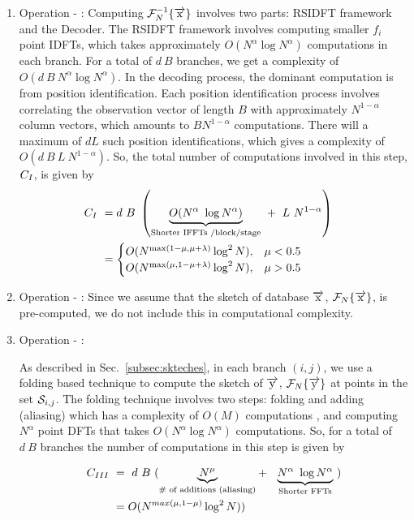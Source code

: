 \begin{enumerate} 
	\item  Operation - :
	 Computing $\mathcal{F}_{N}^{-1}\{ \overrightarrow{\mathrm{x}} \}$ involves two parts: RSIDFT framework and the Decoder. The RSIDFT framework involves computing smaller $f_i$ point IDFTs, which takes approximately $O(N^{\alpha} \log N^{\alpha})$ computations in each branch. For a total of $d~B$ branches, we get a complexity of $O(d ~ B ~ N^{\alpha} \log N^{\alpha})$. In the decoding process, the dominant computation is from position identification. Each position identification process involves correlating the observation vector of length $B$ with approximately $N^{1-\alpha}$ column vectors, which amounts to $B N^{1-\alpha}$ computations. There will a maximum of $d L$ such position identifications, which gives a complexity of $O(d ~B ~L ~N^{1-\alpha} )$.   So, the total number of computations involved in this step, $C_{\RNum{1}}$, is given by
	\begin{align*}
	C_{\RNum{1}} \ &=  {d ~ B} \ \left (
	\underset{\text{Shorter IFFTs /block/stage} }{\underbrace{ O(N^{\alpha} \ \log N^{\alpha})}}  ~ + ~ L~N^{1-\alpha} \right )& \\
	\vspace{2pt}
	\ & =	
	\begin{cases}
	O(N^{\max(1-\mu, \mu + \lambda) } \log^2 N ), &  	 \mu < 0.5\\
	O(N^{\max(\mu, 1- \mu + \lambda )} \log^2 N ), &  	 \mu > 0.5
	\end{cases}
	\end{align*}
	
	
	\item  Operation - :
	Since we assume that the sketch of database $\overrightarrow{\mathrm{x}}$, $\mathcal{F}_{N}\{\overrightarrow{\mathrm{x}}\}$, is pre-computed, we do not include this in computational complexity.
	
	\item  Operation - :
	
	As described in Sec.~\ref{subsec:skteches}, in each branch $(i,j)$, we use a folding based technique to compute the sketch of $\overrightarrow{\mathrm{y}}$, $\mathcal{F}_{N}\{\overrightarrow{\mathrm{y}}\}$ at points in the set $\mathcal{S}_{i,j}$. The folding technique involves two steps: folding and adding (aliasing) which has a complexity of $O(M)$ computations , and computing $N^{\alpha}$ point DFTs that takes $O(N^\alpha \log N^{\alpha})$ computations. So, for a total of $d~B$ branches the number of computations in this step is given by
	
	\begin{align*}
	 C_{\RNum{3}} \ &= \  d ~ B ~ 
	( \underset{\text{\# of additions (aliasing)} }{\underbrace{N^{\mu}}} + \ \
	\underset{\text{Shorter FFTs} }{\underbrace{N^{\alpha} \ \log N^{\alpha}}} \ ) \\
	&=  O(N^{max(\mu,1- \mu)} \log^2 N))
	\end{align*}
	

\end{enumerate}

